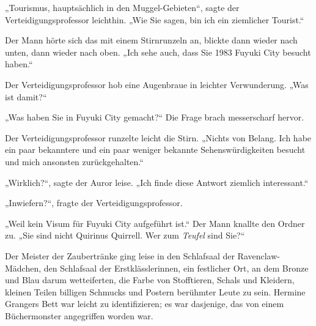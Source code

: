 „Tourismus, hauptsächlich in den Muggel-Gebieten“, sagte der Verteidigungsprofessor leichthin.
„Wie Sie sagen, bin ich ein ziemlicher Tourist.“

Der Mann hörte sich das mit einem Stirnrunzeln an, blickte dann wieder nach unten, dann wieder nach oben.
„Ich sehe auch, dass Sie 1983 Fuyuki City besucht haben.“

Der Verteidigungsprofessor hob eine Augenbraue in leichter Verwunderung.
„Was ist damit?“

„Was haben Sie in Fuyuki City gemacht?“ Die Frage brach messerscharf hervor.

Der Verteidigungsprofessor runzelte leicht die Stirn.
„Nichts von Belang. Ich habe ein paar bekanntere und ein paar weniger bekannte Sehenswürdigkeiten besucht und mich ansonsten zurückgehalten.“

„Wirklich?“, sagte der Auror leise.
„Ich finde diese Antwort ziemlich interessant.“

„Inwiefern?“, fragte der Verteidigungsprofessor.

„Weil kein Visum für Fuyuki City aufgeführt ist.“ Der Mann knallte den Ordner zu.
„Sie sind nicht Quirinus Quirrell. Wer zum \emph{Teufel} sind Sie?“

\later

Der Meister der Zaubertränke ging leise in den Schlafsaal der Ravenclaw-Mädchen, den Schlafsaal der Erstklässlerinnen, ein festlicher Ort, an dem Bronze und Blau darum wetteiferten, die Farbe von Stofftieren, Schals und Kleidern, kleinen Teilen billigen Schmucks und Postern berühmter Leute zu sein. Hermine Grangers Bett war leicht zu identifizieren; es war dasjenige, das von einem Büchermonster angegriffen worden war.

